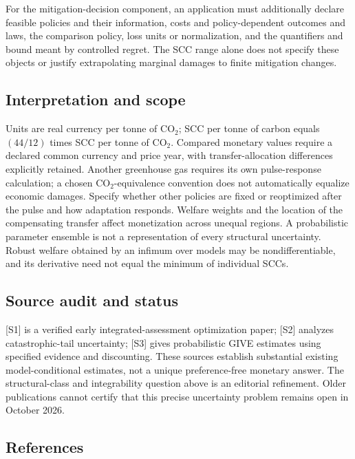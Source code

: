 \documentclass[11pt,a4paper]{article}
\begin{document}
For the mitigation-decision component, an application must additionally declare feasible policies and their information, costs and policy-dependent outcomes and laws, the comparison policy, loss units or normalization, and the quantifiers and bound meant by controlled regret. The SCC range alone does not specify these objects or justify extrapolating marginal damages to finite mitigation changes.

\subsection*{Interpretation and scope}

Units are real currency per tonne of $\mathrm{CO}_2$; SCC per tonne of carbon equals $(44/12)$ times SCC per tonne of $\mathrm{CO}_2$. Compared monetary values require a declared common currency and price year, with transfer-allocation differences explicitly retained. Another greenhouse gas requires its own pulse-response calculation; a chosen $\mathrm{CO}_2$-equivalence convention does not automatically equalize economic damages. Specify whether other policies are fixed or reoptimized after the pulse and how adaptation responds. Welfare weights and the location of the compensating transfer affect monetization across unequal regions. A probabilistic parameter ensemble is not a representation of every structural uncertainty. Robust welfare obtained by an infimum over models may be nondifferentiable, and its derivative need not equal the minimum of individual SCCs.

\subsection*{Source audit and status}

[S1] is a verified early integrated-assessment optimization paper; [S2] analyzes catastrophic-tail uncertainty; [S3] gives probabilistic GIVE estimates using specified evidence and discounting. These sources establish substantial existing model-conditional estimates, not a unique preference-free monetary answer. The structural-class and integrability question above is an editorial refinement. Older publications cannot certify that this precise uncertainty problem remains open in October 2026.

\subsection*{References}
\end{document}
